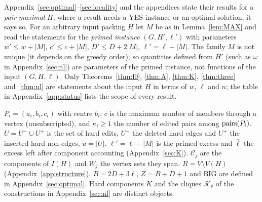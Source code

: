 Appendix~\ref{sec:optimal}--\ref{sec:locality} and the appendices state their results for a \emph{pair-maximal} $H$; where a result needs a YES instance or an optimal solution, it says so. For an arbitrary input packing $H$ let $M$ be as in Lemma~\ref{lem:MAX} and read the statements for the \emph{primed instance} $(G,H',\ell')$ with parameters $w'\le w+|M|$, $c'\le c+|M|$, $D'\le D+2|M|$, $\ell'=\ell-|M|$. The family $M$ is not unique (it depends on the greedy order), so quantities defined from $H'$ (such as $\omega$ in Appendix~\ref{sec:nl}) are parameters of the primed instance, not functions of the input $(G,H,\ell)$. Only Theorems~\ref{thm:l0}, \ref{thm:A}, \ref{thm:K}, \ref{thm:three} and~\ref{thm:nl} are statements about the input $H$ in terms of $w$, $\ell$ and $n$; the table in Appendix~\ref{app:status} lists the scope of every result.

$P_i=(a_i,b_i,c_i)$ with centre $b_i$; $c$ is the maximum number of members through a vertex (unsubscripted), and $\kappa_i\ge1$ the number of edited pairs among $\mathrm{pairs}(P_i)$. $U=U^-\cup U^+$ is the set of hard edits, $U^-$ the deleted hard edges and $U^+$ the inserted hard non-edges, $u=|U|$. $\ell'=\ell-|M|$ is the primed excess and $\bar\ell$ the excess left after component accounting (Appendix~\ref{sec:K}). $\mathcal C_j$ are the components of $I(H)$ and $W_j$ the vertex sets they span. $R=V\setminus V(H)$ (Appendix~\ref{app:structure}). $B=2D+3\ell$, $Z=B+D+1$ and $\mathrm{BIG}$ are defined in Appendix~\ref{sec:optimal}. Hard components $K$ and the cliques $\mathcal K_v$ of the constructions in Appendix~\ref{sec:nl} are distinct objects.
